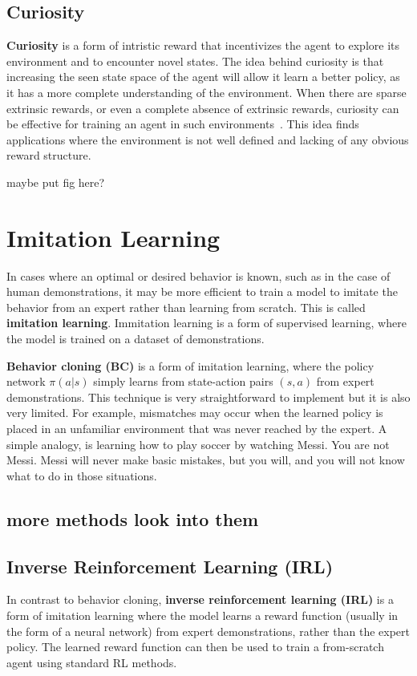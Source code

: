 \documentclass[12pt]{report}
\theoremstyle{definition}
\theoremstyle{remark}
\begin{document}
\subsection{Curiosity}
\textbf{Curiosity} is a form of intristic reward that incentivizes the agent to explore its environment and to encounter novel states. The idea behind curiosity is that increasing the seen state space of the agent will allow it learn a better policy, as it has a more complete understanding of the environment. When there are sparse extrinsic rewards, or even a complete absence of extrinsic rewards, curiosity can be effective for training an agent in such environments~\cite{pathak_curiosity-driven_2017}. This idea finds applications where the environment is not well defined and lacking of any obvious reward structure.

maybe put fig here?

\section{Imitation Learning}
In cases where an optimal or desired behavior is known, such as in the case of human demonstrations, it may be more efficient to train a model to imitate the behavior from an expert rather than learning from scratch. This is called \textbf{imitation learning}. Immitation learning is a form of supervised learning, where the model is trained on a dataset of demonstrations.

\textbf{Behavior cloning (BC)} is a form of imitation learning, where the policy network $\pi(a|s)$ simply learns from state-action pairs $(s, a)$ from expert demonstrations. This technique is very straightforward to implement but it is also very limited. For example, mismatches may occur when the learned policy is placed in an unfamiliar environment that was never reached by the expert. A simple analogy, is learning how to play soccer by watching Messi. You are not Messi. Messi will never make basic mistakes, but you will, and you will not know what to do in those situations.

\subsection{more methods look into them}

\subsection{Inverse Reinforcement Learning (IRL)}
In contrast to behavior cloning, \textbf{inverse reinforcement learning (IRL)} is a form of imitation learning where the model learns a reward function (usually in the form of a neural network) from expert demonstrations, rather than the expert policy. The learned reward function can then be used to train a from-scratch agent using standard RL methods.
\end{document}
